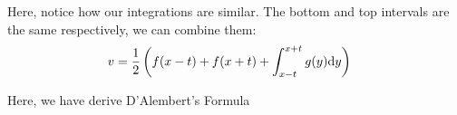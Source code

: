 Here, notice how our integrations are similar. The bottom and top intervals are the same respectively, we can combine them:
%
\begin{align}
  v & =
  \frac{1}{2} \left( f(x - t) + f(x + t) + \int^{x + t}_{x - t} g(y) \text dy \right)
\end{align}


Here, we have derive D'Alembert's Formula
